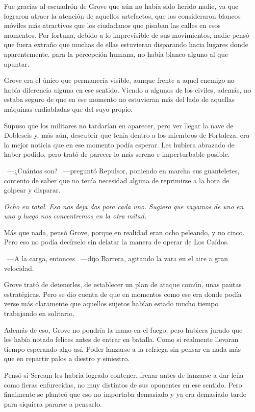 Fue gracias al escuadrón de Grove que aún no había sido herido nadie, ya que lograron atraer la atención de aquellos artefactos, que los consideraron blancos móviles más atractivos que los ciudadanos que pisaban las calles en esos momentos. Por fortuna, debido a lo imprevisible de sus movimientos, nadie pensó que fuera extraño que muchas de ellas estuvieran disparando hacia lugares donde aparentemente, para la percepción humana, no había blanco alguno al que apuntar.

Grove era el único que permanecía visible, aunque frente a aquel enemigo no había diferencia alguna en ese sentido. Viendo a algunos de los civiles, además, no estaba seguro de que en ese momento no estuvieran más del lado de aquellas máquinas endiabladas que del suyo propio.

Supuso que los militares no tardarían en aparecer, pero ver llegar la nave de Dobleseis y, más aún, descubrir que tenía dentro a los miembros de Fortaleza, era la mejor noticia que en ese momento podía esperar. Les hubiera abrazado de haber podido, pero trató de parecer lo más sereno e imperturbable posible.

~---¿Cuántos son? ~---preguntó Repulsor, poniendo en marcha sus guanteletes, contento de saber que no tenía necesidad alguna de reprimirse a la hora de golpear y disparar.

\emph{Ocho en total. Eso nos deja dos para cada uno. Sugiero que vayamos de uno en uno y luego nos concentremos en la otra mitad.}

Más que nada, pensó Grove, porque en realidad eran ocho peleando, y no cinco. Pero eso no podía decírselo sin delatar la manera de operar de Los Caídos.

~---A la carga, entonces ~---dijo Barrera, agitando la vara en el aire a gran velocidad.

Grove trató de detenerles, de establecer un plan de ataque común, unas pautas estratégicas. Pero se dio cuenta de que en momentos como ese era donde podía verse más claramente que aquellos sujetos habían estado mucho tiempo trabajando en solitario.

Además de eso, Grove no pondría la mano en el fuego, pero hubiera jurado que les había notado felices antes de entrar en batalla. Como si realmente llevaran tiempo esperando algo así. Poder lanzarse a la refriega sin pensar en nada más que en repartir palos a diestro y siniestro.

Pensó si Scream les habría logrado contener, frenar antes de lanzarse a dar leña como fieras enfurecidas, no muy distintos de sus oponentes en ese sentido. Pero finalmente se planteó que eso no importaba demasiado y ya era demasiado tarde para siquiera pararse a pensarlo.

